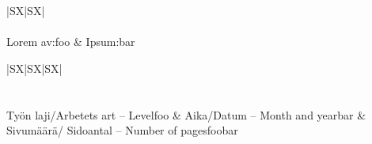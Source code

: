 \documentclass[a4paper,11pt]{article}
\begin{document}
\newpage
\thispagestyle{empty}
\noindent
\begin{tabularx}{\linewidth}{|S{X}|S{X}|}
  \hline
  \\
  \hline
   {\lipsum[2]} \\
  \hline
  \textsf{Lorem av}:\newline foo & \textsf{Ipsum:}\newline bar \\
  \hline
\end{tabularx}

\begin{tabularx}{\linewidth}{|S{X}|S{X}|S{X}|}
  \hline
  \\
  \hline
  \\
  \hline
   {\lipsum[2]} \\
  \hline
  \textsf{Työn laji/Arbetets art – Level}\newline foo & \textsf{Aika/Datum – Month and year}\newline bar & \textsf{Sivumäärä/ Sidoantal – Number of pages}\newline foobar \\
  \hline
\end{tabularx}
\end{document}
